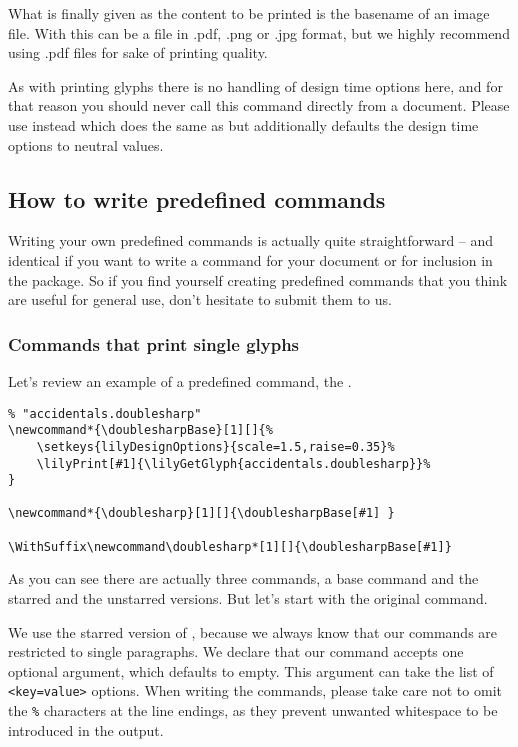 \documentclass{article}
\begin{document}
What is finally given as the content to be printed is the basename of an image file.
With \XeLaTeX this can be a file in .pdf, .png or .jpg format, but we highly recommend using .pdf files for sake of printing quality.

As with printing \emmentaler glyphs there is no handling of design time options here, and for that reason you should never call this command directly from a document.
Please use  instead which does the same as  but additionally defaults the design time options to neutral values.

\subsection{How to write predefined commands}
\label{subsec:howto_predefined_commands}
Writing your own predefined commands is actually quite straightforward -- and identical if you want to write a command for your document or for inclusion in the package.
So if you find yourself creating predefined commands that you think are useful for general use, don't hesitate to submit them to us. 

\subsubsection{Commands that print single glyphs}
\label{subsubsec:commands_single-glyphs}
Let's review an example of a predefined command, the .

\begin{verbatim}
% "accidentals.doublesharp"
\newcommand*{\doublesharpBase}[1][]{%
    \setkeys{lilyDesignOptions}{scale=1.5,raise=0.35}%
    \lilyPrint[#1]{\lilyGetGlyph{accidentals.doublesharp}}%
}

\newcommand*{\doublesharp}[1][]{\doublesharpBase[#1] }

\WithSuffix\newcommand\doublesharp*[1][]{\doublesharpBase[#1]}
\end{verbatim}
As you can see there are actually three commands, a base command and the starred and the unstarred versions.
But let's start with the original command.

We use the starred version of , because we always know that our commands are restricted to single paragraphs.
We declare that our command accepts one optional argument, which defaults to empty. 
This argument can take the list of \texttt{<key=value>} options.
When writing the commands, please take care not to omit the \texttt{\%} characters at the line endings, as they prevent unwanted whitespace to be introduced in the output.
\end{document}
